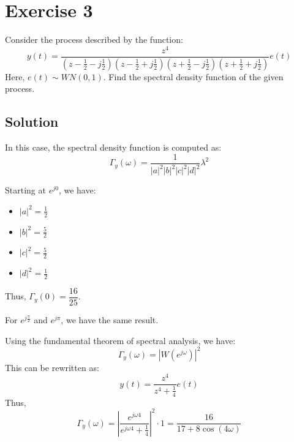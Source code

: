 \section{Exercise 3}

Consider the process described by the function:
\[y(t)=\dfrac{z^4}{\left(z-\frac{1}{2}-j\frac{1}{2}\right)\left(z-\frac{1}{2}+j\frac{1}{2}\right)\left(z+\frac{1}{2}-j\frac{1}{2}\right)\left(z+\frac{1}{2}+j\frac{1}{2}\right)}e(t)\]
Here, $e(t) \sim WN(0,1)$. 
Find the spectral density function of the given process.

\subsection*{Solution}
In this case, the spectral density function is computed as:
\[\Gamma_y(\omega)=\dfrac{1}{\left\lvert a \right\rvert^2\left\lvert b \right\rvert^2\left\lvert c \right\rvert^2\left\lvert d \right\rvert^2}\lambda^2\]

Starting at $e^{j0}$, we have:
\begin{itemize}
    \item $\left\lvert a \right\rvert^2=\frac{1}{2}$
    \item $\left\lvert b \right\rvert^2=\frac{5}{2}$
    \item $\left\lvert c \right\rvert^2=\frac{5}{2}$
    \item $\left\lvert d \right\rvert^2=\frac{1}{2}$
\end{itemize}
Thus, $\Gamma_y(0)=\dfrac{16}{25}$. 

For $e^{j\frac{\pi}{2}}$ and $e^{j\pi}$, we have the same result.

Using the fundamental theorem of spectral analysis, we have:
\[\Gamma_y(\omega)=\left\lvert W(e^{j\omega})\right\rvert^2\]
This can be rewritten as:
\[y(t)=\dfrac{z^4}{z^4+\frac{1}{4}}e(t)\]
Thus,
\[\Gamma_y(\omega)=\left\lvert \dfrac{e^{j\omega 4}}{e^{j\omega 4}+\frac{1}{4}}\right\rvert^2 \cdot 1=\dfrac{16}{17+8\cos(4\omega)}\]